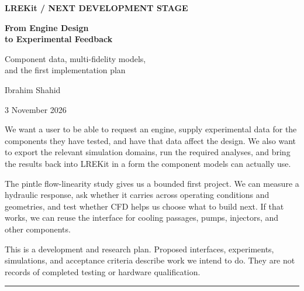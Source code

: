 \begin{titlepage}
\thispagestyle{empty}
\vspace*{0.15in}
{\sffamily\bfseries\color{teal}\large LREKit \enspace / \enspace NEXT DEVELOPMENT STAGE\par}
\vspace{0.48in}
{\sffamily\bfseries\color{ink}\fontsize{30}{35}\selectfont
From Engine Design\\to Experimental Feedback\par}
\vspace{0.22in}
{\sffamily\large\color{muted}Component data, multi-fidelity models,\\and the first implementation plan\par}
\vspace{0.35in}
{\large Ibrahim Shahid\par}
{\color{muted}3 November 2026\par}
\vspace{0.38in}
We want a user to be able to request an engine, supply experimental data for the components they have tested, and have that data affect the design. We also want to export the relevant simulation domains, run the required analyses, and bring the results back into LREKit in a form the component models can actually use.

The pintle flow-linearity study gives us a bounded first project. We can measure a hydraulic response, ask whether it carries across operating conditions and geometries, and test whether CFD helps us choose what to build next. If that works, we can reuse the interface for cooling passages, pumps, injectors, and other components.


\vfill
{\small\color{muted}
This is a development and research plan. Proposed interfaces, experiments, simulations, and acceptance criteria describe work we intend to do. They are not records of completed testing or hardware qualification.\par}
\vspace{0.12in}
{\color{teal}\rule{\linewidth}{1.2pt}}
\end{titlepage}

